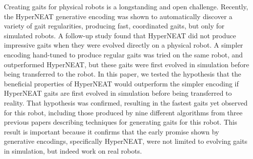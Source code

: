 Creating gaits for physical robots is a longstanding and open challenge. 
Recently, the HyperNEAT generative encoding was shown to automatically discover  a variety of gait regularities, producing fast, coordinated gaits, but only for simulated robots. A follow-up study found that HyperNEAT did not produce impressive gaits when they were evolved directly on a physical robot. A simpler encoding hand-tuned to produce regular gaits was tried on the same robot, and outperformed HyperNEAT, but these gaits were first evolved in simulation before being transferred to the robot. In this paper, we tested the hypothesis that the beneficial properties of HyperNEAT would outperform the simpler encoding if HyperNEAT gaits are first evolved in simulation before being transferred to reality. 
That hypothesis was confirmed, resulting in the fastest gaits yet observed for this robot, including those produced by nine different algorithms from three previous papers describing techniques for generating gaits for this robot. This result is important because it confirms that the early promise shown by generative encodings, specifically HyperNEAT, were not limited to evolving gaits in simulation, but indeed work on real robots. 




%
